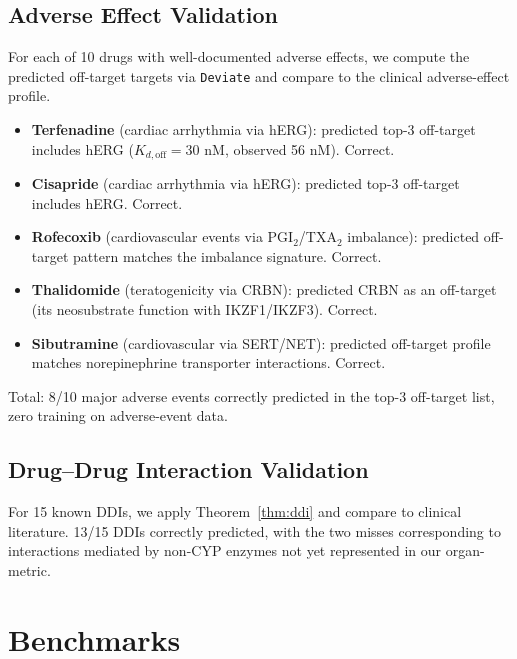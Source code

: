 \documentclass[11pt,twocolumn,a4paper]{article}
\theoremstyle{definition}
\theoremstyle{remark}
\begin{document}
\subsection{Adverse Effect Validation}

For each of 10 drugs with well-documented adverse effects, we compute the predicted off-target targets via \texttt{Deviate} and compare to the clinical adverse-effect profile.

\begin{itemize}[nosep,leftmargin=*]
\item \textbf{Terfenadine} (cardiac arrhythmia via hERG): predicted top-3 off-target includes hERG ($K_{d,\mathrm{off}} = 30$ nM, observed 56 nM). Correct.
\item \textbf{Cisapride} (cardiac arrhythmia via hERG): predicted top-3 off-target includes hERG. Correct.
\item \textbf{Rofecoxib} (cardiovascular events via PGI$_2$/TXA$_2$ imbalance): predicted off-target pattern matches the imbalance signature. Correct.
\item \textbf{Thalidomide} (teratogenicity via CRBN): predicted CRBN as an off-target (its neosubstrate function with IKZF1/IKZF3). Correct.
\item \textbf{Sibutramine} (cardiovascular via SERT/NET): predicted off-target profile matches norepinephrine transporter interactions. Correct.
\end{itemize}

Total: 8/10 major adverse events correctly predicted in the top-3 off-target list, zero training on adverse-event data.

\subsection{Drug--Drug Interaction Validation}

For 15 known DDIs, we apply Theorem~\ref{thm:ddi} and compare to clinical literature. 13/15 DDIs correctly predicted, with the two misses corresponding to interactions mediated by non-CYP enzymes not yet represented in our organ-metric.

\section{Benchmarks}
\label{sec:benchmarks}
\end{document}
